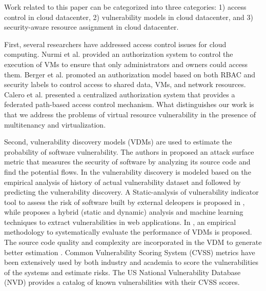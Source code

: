 Work related to this paper can be categorized into three categories: 1) access control in cloud datacenter, 2) vulnerability models in cloud datacenter, and 3) security-aware resource assignment in cloud datacenter.


First, several researchers have addressed access control issues for cloud computing. Nurmi et al. \cite{nurmi2009eucalyptus} provided an authorization system to control the execution of VMs to ensure that only administrators and owners could access them. Berger et al. \cite{berger2009security} promoted an authorization model based on both RBAC and security labels to control access to shared data, VMs, and network resources. Calero et al. \cite{alcaraz10} presented a centralized authorization system that provides a federated path-based access control mechanism. What distinguishes our work is that we address the problems of virtual resource vulnerability in the presence of multitenancy and virtualization. 

Second, vulnerability discovery models (VDMs) are used to estimate the probability of software vulnerability. The authors in \cite{manadhata2011attack} proposed an attack surface metric that measures the security of software by analyzing its source code and find the potential flows. In \cite{alhazmi2007measuring} the vulnerability discovery is modeled based on the empirical analysis of history of actual vulnerability dataset and followed by predicting the vulnerability discovery. A Static-analysis of vulnerability indicator tool to assess the risk of software built by external deleopers is proposed in \cite{walden2012savi}, while \cite{shar2015web} proposes a hybrid (static and dynamic) analysis and machine learning techniques to extract vulnerabilities in web applications.  In \cite{massacci2014empirical}, an empirical methodology to systematically evaluate the performance of VDMs is proposed. The source code quality and complexity are incorporated in the VDM to generate better estimation \cite{rahimi2013vulnerability}. Common Vulnerability Scoring System (CVSS) \cite{mell2007complete} metrics have been extensively used by both industry and academia to score the vulnerabilities of the systems and estimate risks. The  US National Vulnerability Database (NVD) provides a catalog of known vulnerabilities with their CVSS scores. 

